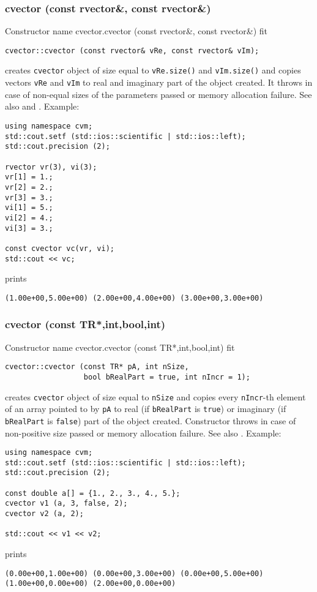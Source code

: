 \subsubsection{cvector (const rvector\&, const rvector\&)}
Constructor%
\pdfdest name {cvector.cvector (const rvector&, const rvector&)} fit
\begin{verbatim}
cvector::cvector (const rvector& vRe, const rvector& vIm);
\end{verbatim}
creates  \verb"cvector" object
of size equal to \verb"vRe.size()" and \verb"vIm.size()"
and copies vectors \verb"vRe" and \verb"vIm"
to  real and imaginary part of the object created.
It throws  
in case of non-equal sizes of the parameters passed
or memory allocation failure.
See also  and .
Example:
\begin{Verbatim}
using namespace cvm;
std::cout.setf (std::ios::scientific | std::ios::left);
std::cout.precision (2);

rvector vr(3), vi(3);
vr[1] = 1.;
vr[2] = 2.;
vr[3] = 3.;
vi[1] = 5.;
vi[2] = 4.;
vi[3] = 3.;

const cvector vc(vr, vi);
std::cout << vc;
\end{Verbatim}
prints
\begin{Verbatim}
(1.00e+00,5.00e+00) (2.00e+00,4.00e+00) (3.00e+00,3.00e+00)
\end{Verbatim}
\newpage



\subsubsection{cvector (const TR*,int,bool,int)}
Constructor%
\pdfdest name {cvector.cvector (const TR*,int,bool,int)} fit
\begin{verbatim}
cvector::cvector (const TR* pA, int nSize,
                  bool bRealPart = true, int nIncr = 1);
\end{verbatim}
creates  \verb"cvector" object
of size equal to \verb"nSize" and copies every
\verb"nIncr"-th element of an array  pointed to by \verb"pA"
to  real (if \verb"bRealPart" is \verb"true")
or imaginary (if \verb"bRealPart" is \verb"false")
part of the object created.
Constructor throws  
in case of non-positive size passed or memory allocation failure.
See also .
Example:
\begin{Verbatim}
using namespace cvm;
std::cout.setf (std::ios::scientific | std::ios::left);
std::cout.precision (2);

const double a[] = {1., 2., 3., 4., 5.};
cvector v1 (a, 3, false, 2);
cvector v2 (a, 2);

std::cout << v1 << v2;
\end{Verbatim}
prints
\begin{Verbatim}
(0.00e+00,1.00e+00) (0.00e+00,3.00e+00) (0.00e+00,5.00e+00)
(1.00e+00,0.00e+00) (2.00e+00,0.00e+00)
\end{Verbatim}
\newpage



